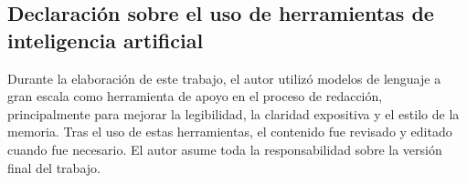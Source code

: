 \documentclass[a4paper,11pt]{book}
\begin{document}


\frontmatter
\tableofcontents
\listoffigures
\listoftables
\mainmatter
\setlength{\parskip}{5pt}















\appendix




 


\newpage
\thispagestyle{plain}
\section*{Declaración sobre el uso de herramientas de inteligencia artificial}

Durante la elaboración de este trabajo, el autor utilizó modelos de lenguaje a gran escala como herramienta de apoyo en el proceso de redacción, principalmente para mejorar la legibilidad, la claridad expositiva y el estilo de la memoria. Tras el uso de estas herramientas, el contenido fue revisado y editado cuando fue necesario. El autor asume toda la responsabilidad sobre la versión final del trabajo.


\chapter*{}
\thispagestyle{empty}
\end{document}
